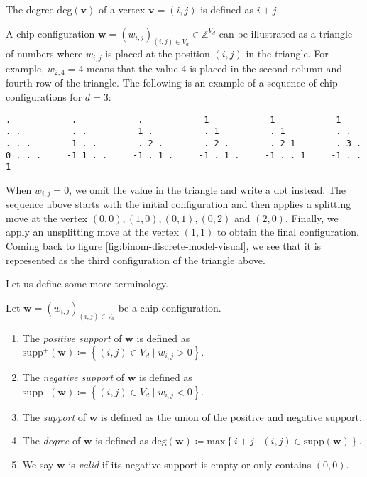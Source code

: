 \begin{definition}
    The degree \( \mathrm{deg}(\mathbf{v}) \) of a vertex \( \mathbf{v} = (i,j) \) is defined as \( i + j \).
\end{definition}

\begin{example}
    A chip configuration \( \mathbf{w} = (w_{i,j})_{(i,j) \in V_d} \in \mathbb{Z}^{V_d} \) can be illustrated as a triangle of numbers where \( w_{i,j} \) is placed at the position \( (i,j) \) in the triangle. For example, \( w_{2,4} = 4 \) means that the value \( 4 \) is placed in the second column and fourth row of the triangle. The following is an example of a sequence of chip configurations for \( d = 3 \):
    \begin{verbatim}
.            .            .            1            1            1
. .          . .          1 .          . 1          . 1          . .
. . .        1 . .        . 2 .        . 2 .        . 2 1        . 3 .
0 . . .     -1 1 . .     -1 . 1 .     -1 . 1 .     -1 . . 1     -1 . . 1
    \end{verbatim}
    When \( w_{i,j} = 0 \), we omit the value in the triangle and write a dot instead. The sequence above starts with the initial configuration and then applies a splitting move at the vertex \( (0,0), (1,0), (0,1), (0,2) \) and \( (2,0) \). Finally, we apply an unsplitting move at the vertex \( (1,1) \) to obtain the final configuration. Coming back to figure \ref{fig:binom-discrete-model-visual}, we see that it is represented as the third configuration of the triangle above.
\end{example}

Let us define some more terminology.

\begin{definition}
    Let \( \mathbf{w} = (w_{i,j})_{(i,j) \in V_d} \) be a chip configuration.
    \begin{enumerate}
        \item The \emph{positive support} of \( \mathbf{w} \) is defined as \( \mathrm{supp}^+(\mathbf{w}) \coloneqq \left\{ (i,j) \in V_d\mid w_{i,j} > 0 \right\} \).
        \item The \emph{negative support} of \( \mathbf{w} \) is defined as \( \mathrm{supp}^-(\mathbf{w}) \coloneqq \left\{ (i,j) \in V_d\mid w_{i,j} < 0 \right\} \).
        \item The \emph{support} of \( \mathbf{w} \) is defined as the union of the positive and negative support.
        \item The \emph{degree} of \( \mathbf{w} \) is defined as \( \mathrm{deg}(\mathbf{w}) \coloneqq \mathrm{max}\left\{ i+j \mid (i,j) \in \mathrm{supp}(\mathbf{w}) \right\} \).
        \item We say \( \mathbf{w} \) is \emph{valid} if its negative support is empty or only contains \( (0,0) \).
    \end{enumerate}
\end{definition}


